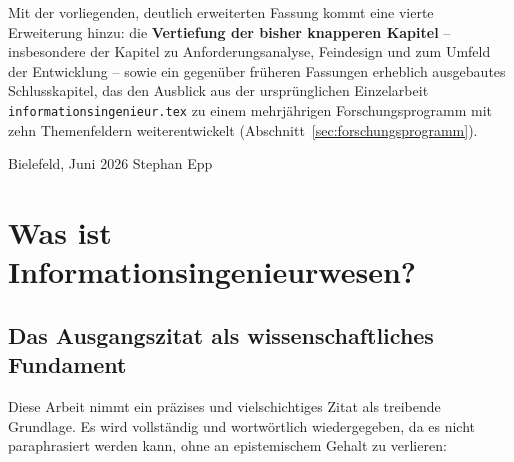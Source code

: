 ﻿\documentclass[a4paper,12pt]{report}
\theoremstyle{definition}
\begin{document}
\noindent
Mit der vorliegenden, deutlich erweiterten Fassung kommt eine vierte
Erweiterung hinzu: die \textbf{Vertiefung der bisher knapperen Kapitel} --
insbesondere der Kapitel zu Anforderungsanalyse, Feindesign und zum Umfeld
der Entwicklung -- sowie ein gegenüber früheren Fassungen erheblich
ausgebautes Schlusskapitel, das den Ausblick aus der ursprünglichen
Einzelarbeit \texttt{informationsingenieur.tex} zu einem mehrjährigen
Forschungsprogramm mit zehn Themenfeldern weiterentwickelt
(Abschnitt~\ref{sec:forschungsprogramm}).

\bigskip
\noindent Bielefeld, Juni 2026 \hfill Stephan Epp

\chapter{Was ist Informationsingenieurwesen?}

\section{Das Ausgangszitat als wissenschaftliches Fundament}
\label{sec:ausgangszitat}

Diese Arbeit nimmt ein präzises und vielschichtiges Zitat als treibende Grundlage. Es wird
vollständig und wortwörtlich wiedergegeben, da es nicht paraphrasiert werden kann, ohne an
epistemischem Gehalt zu verlieren:
\end{document}
